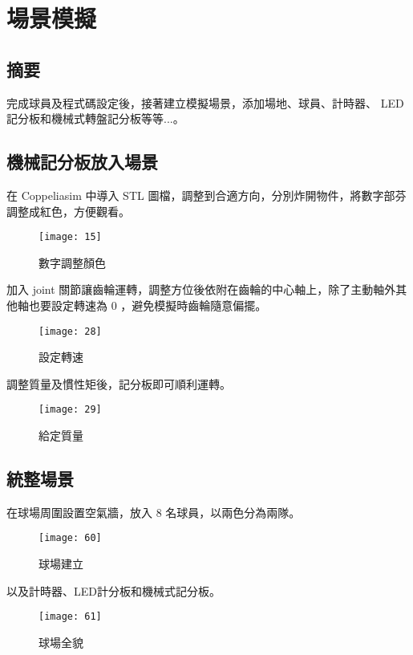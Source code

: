 \chapter{場景模擬}
\renewcommand{\baselinestretch}{10.0} %
\setcounter{page}{17}  %
\fontsize{14pt}{2.5pt}\sectionef
\section{摘要}
  完成球員及程式碼設定後，接著建立模擬場景，添加場地、球員、計時器、 LED 記分板和機械式轉盤記分板等等...。\\
\section{機械記分板放入場景}
  在 Coppeliasim 中導入 STL 圖檔，調整到合適方向，分別炸開物件，將數字部芬調整成紅色，方便觀看。\\
\begin{figure}[hbt!]
\begin{center}
\texttt{[image: 15]}
\caption{\Large 數字調整顏色}\label{fig.15}
\end{center}
\end{figure}

  加入 joint 關節讓齒輪運轉，調整方位後依附在齒輪的中心軸上，除了主動軸外其他軸也要設定轉速為 0 ，避免模擬時齒輪隨意偏擺。\\
\begin{figure}[hbt!]
\begin{center}
\texttt{[image: 28]}
\caption{\Large 設定轉速}\label{fig.28}
\end{center}
\end{figure}
\newpage
  調整質量及慣性矩後，記分板即可順利運轉。\\
\begin{figure}[hbt!]
\begin{center}
\texttt{[image: 29]}
\caption{\Large 給定質量}\label{fig.29}
\end{center}
\end{figure}

\newpage
\section{統整場景}
  在球場周圍設置空氣牆，放入 8 名球員，以兩色分為兩隊。\\
\begin{figure}[hbt!]
\begin{center}
\texttt{[image: 60]}
\caption{\Large 球場建立}\label{fig.60}
\end{center}
\end{figure}

  以及計時器、LED計分板和機械式記分板。\\
\begin{figure}[hbt!]
\begin{center}
\texttt{[image: 61]}
\caption{\Large 球場全貌}\label{fig.61}
\end{center}
\end{figure}
\renewcommand{\baselinestretch}{1} %